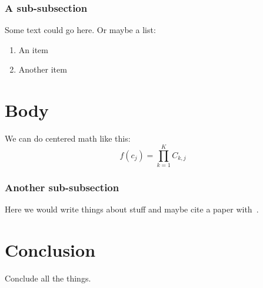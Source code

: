 \documentclass[conference]{IEEEtran}
\begin{document}
    \subsubsection{A sub-subsection}
    Some text could go here. Or maybe a list:
    \begin{enumerate}
        \item {An item}
        \item {Another item}
    \end{enumerate}
    \section{Body}
    We can do centered math like this:
    \[f(c_{j}) = \prod_{k = 1}^{K}C_{k, j}\] 
    \subsubsection{Another sub-subsection}
    Here we would write things about stuff and maybe cite a paper with~\cite{Amdahl:1967:VSP:1465482.1465560}.
    \section{Conclusion}
    Conclude all the things.
    \printbibliography
\end{document}
